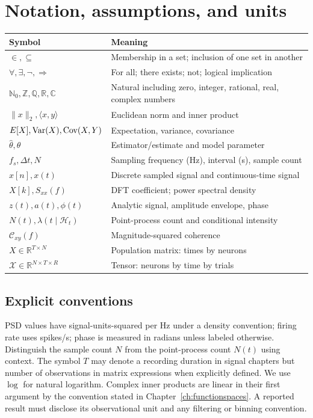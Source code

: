 \chapter{Notation, assumptions, and units}
\begin{center}\begin{tabular}{p{}p{}}\toprule
Symbol & Meaning\\\midrule
$\in,\subseteq$ & Membership in a set; inclusion of one set in another\\
$\forall,\exists,\neg,\Rightarrow$ & For all; there exists; not; logical implication\\
$\mathbb N_0,\mathbb Z,\mathbb Q,\mathbb R,\mathbb C$ & Natural including zero, integer, rational, real, complex numbers\\
$\|x\|_2,\langle x,y\rangle$ & Euclidean norm and inner product\\
$E[X],\operatorname{Var}(X),\operatorname{Cov}(X,Y)$ & Expectation, variance, covariance\\
$\hat\theta,\theta$ & Estimator/estimate and model parameter\\
$f_s,\Delta t,N$ & Sampling frequency (Hz), interval (s), sample count\\
$x[n],x(t)$ & Discrete sampled signal and continuous-time signal\\
$X[k],S_{xx}(f)$ & DFT coefficient; power spectral density\\
$z(t),a(t),\phi(t)$ & Analytic signal, amplitude envelope, phase\\
$N(t),\lambda(t\mid\mathcal H_t)$ & Point-process count and conditional intensity\\
$\mathcal C_{xy}(f)$ & Magnitude-squared coherence\\
$X\in\mathbb R^{T\times N}$ & Population matrix: times by neurons\\
$\mathcal X\in\mathbb R^{N\times T\times R}$ & Tensor: neurons by time by trials\\
\bottomrule\end{tabular}\end{center}

\section*{Explicit conventions}
PSD values have signal-units-squared per Hz under a density convention; firing rate uses spikes/s; phase is measured in radians unless labeled otherwise. Distinguish the sample count $N$ from the point-process count $N(t)$ using context. The symbol $T$ may denote a recording duration in signal chapters but number of observations in matrix expressions when explicitly defined. We use $\log$ for natural logarithm. Complex inner products are linear in their first argument by the convention stated in Chapter~\ref{ch:functionspaces}. A reported result must disclose its observational unit and any filtering or binning convention.